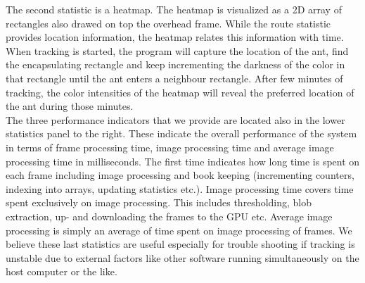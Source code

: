 The second statistic is a heatmap. The heatmap is visualized as a 2D array of rectangles also drawed on top the overhead frame. While the route statistic provides location information, the heatmap relates this information with time. When tracking is started, the program will capture the location of the ant, find the encapsulating rectangle and keep incrementing the darkness of the color in that rectangle until the ant enters a neighbour rectangle. After few minutes of tracking, the color intensities of the heatmap will reveal the preferred location of the ant during those minutes. \\

The three performance indicators that we provide are located also in the lower statistics panel to the right. These indicate the overall performance of the system in terms of frame processing time, image processing time and average image processing time in milliseconds. The first time indicates how long time is spent on each frame including image processing and book keeping (incrementing counters, indexing into arrays, updating statistics etc.). Image processing time covers time spent exclusively on image processing. This includes thresholding, blob extraction, up- and downloading the frames to the GPU etc. Average image processing is simply an average of time spent on image processing of frames. We believe these last statistics are useful especially for trouble shooting if tracking is unstable due to external factors like other software running simultaneously on the host computer or the like.

